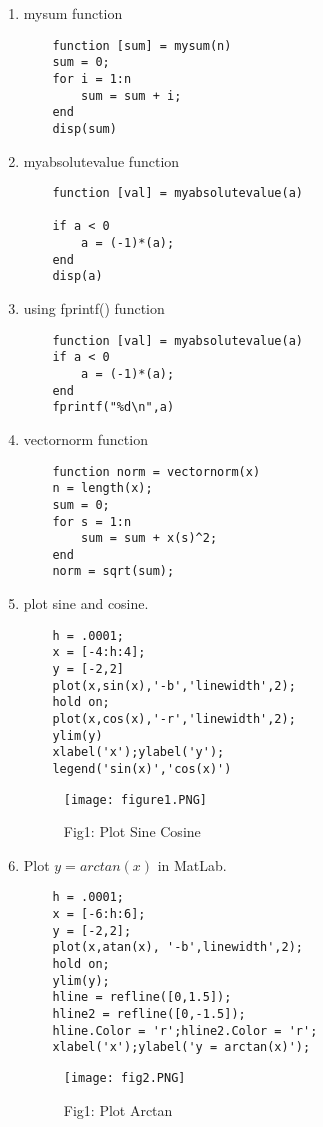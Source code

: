 \documentclass{article}
\begin{document}
\begin{enumerate}
    \item mysum function
    \begin{lstlisting}
    function [sum] = mysum(n)
    sum = 0;
    for i = 1:n
        sum = sum + i;
    end
    disp(sum)
    \end{lstlisting}
    \item myabsolutevalue function
    \begin{lstlisting}
    function [val] = myabsolutevalue(a)

    if a < 0
        a = (-1)*(a);
    end
    disp(a)
    \end{lstlisting}
    \item using fprintf() function
    \begin{lstlisting}
    function [val] = myabsolutevalue(a)
    if a < 0
        a = (-1)*(a);
    end
    fprintf("%d\n",a)
    \end{lstlisting}
    \item vectornorm function
    \begin{lstlisting}
    function norm = vectornorm(x)
    n = length(x);
    sum = 0;
    for s = 1:n
        sum = sum + x(s)^2;
    end
    norm = sqrt(sum);
    \end{lstlisting}
    \item plot sine and cosine. 
    \begin{lstlisting}
    h = .0001;
    x = [-4:h:4];
    y = [-2,2]
    plot(x,sin(x),'-b','linewidth',2);
    hold on;
    plot(x,cos(x),'-r','linewidth',2);
    ylim(y)
    xlabel('x');ylabel('y');
    legend('sin(x)','cos(x)')
    \end{lstlisting}
    \begin{figure}[h!]
\centering
\texttt{[image: figure1.PNG]}
\caption{Fig1: Plot Sine Cosine}
\label{fig:plotSC}
\end{figure}
    \item Plot $y = arctan(x)$ in MatLab. 
    \begin{lstlisting}
    h = .0001;
    x = [-6:h:6];
    y = [-2,2];
    plot(x,atan(x), '-b',linewidth',2);
    hold on;
    ylim(y);
    hline = refline([0,1.5]);
    hline2 = refline([0,-1.5]);
    hline.Color = 'r';hline2.Color = 'r';
    xlabel('x');ylabel('y = arctan(x)');
    \end{lstlisting}
    \begin{figure}[h!]
\centering
\texttt{[image: fig2.PNG]}
\caption{Fig1: Plot Arctan}
\label{fig:plotSC}
\end{figure}

\end{enumerate}
\end{document}
